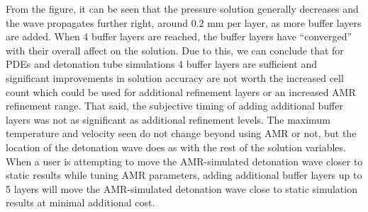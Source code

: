 \noindent From the figure, it can be seen that the pressure solution generally decreases and the wave propagates further right, around 0.2 mm per layer, as more buffer layers are added. When 4 buffer layers are reached, the buffer layers have ``converged'' with their overall affect on the solution. Due to this, we can conclude that for PDEs and detonation tube simulations 4 buffer layers are sufficient and significant improvements in solution accuracy are not worth the increased cell count which could be used for additional refinement layers or an increased AMR refinement range. That said, the subjective timing of adding additional buffer layers was not as significant as additional refinement levels. The maximum temperature and velocity seen do not change beyond using AMR or not, but the location of the detonation wave does as with the rest of the solution variables. When a user is attempting to move the AMR-simulated detonation wave closer to static results while tuning AMR parameters, adding additional buffer layers up to 5 layers will move the AMR-simulated detonation wave close to static simulation results at minimal additional cost. 

